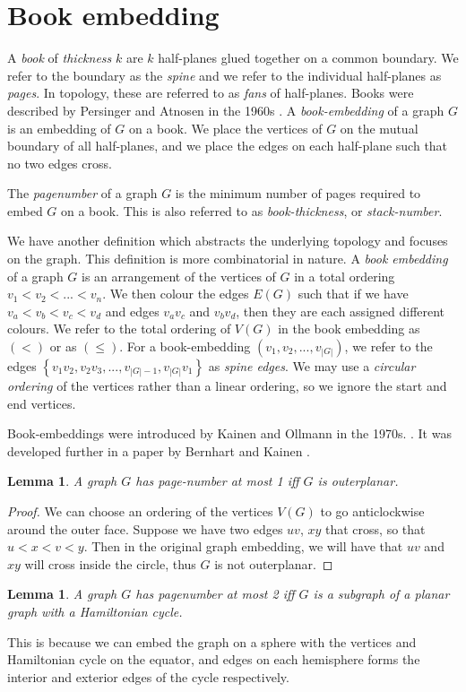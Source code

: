 \documentclass[]{report}
\newtheorem{lemma}[theorem]{Lemma}
\theoremstyle{definition}
\numberwithin{theorem}{section}
\numberwithin{equation}{section}
\begin{document}
\section{Book embedding}\label{sec:Book Embedding}
A \textit{book} of \textit{thickness} $k$ are $k$ half-planes glued together on a common boundary. We refer to the boundary as the \textit{spine} and we refer to the individual half-planes as \textit{pages}. In topology, these are referred to as \textit{fans} of half-planes. Books were described by Persinger and Atnosen in the 1960s \cite{persingerSubsetsNbooksE31966} \cite{atneosenOnedimensionalNleavedContinua1972}. 
A \textit{book-embedding} of a graph $G$ is an embedding of $G$ on a book. We place the vertices of $G$ on the mutual boundary of all half-planes, and we place the edges on each half-plane such that no two edges cross.

The \textit{pagenumber} of a graph $G$ is the minimum number of pages required to embed $G$ on a book. This is also referred to as \textit{book-thickness}, or \textit{stack-number}. 

We have another definition which abstracts the underlying topology and focuses on the graph. This definition is more combinatorial in nature. 
A \textit{book embedding} of a graph $G$ is an arrangement of the vertices of $G$ in a total ordering $v_1 < v_2 < ... < v_n$. We then colour the edges $E(G)$ such that if we have $v_a < v_b < v_c < v_d$ and edges $v_a v_c$ and $v_b v_d$, then they are each assigned different colours.
We refer to the total ordering of $V(G)$ in the book embedding as $(<)$ or as $(\leq)$. For a book-embedding $(v_1, v_2, ..., v_{|G|})$, we refer to the edges $\left\{v_1 v_2, v_2 v_3, ..., v_{|G| - 1}, v_{|G|}v_{1}\right\}$ as \textit{spine edges}.
We may use a \textit{circular ordering} of the vertices rather than a linear ordering, so we ignore the start and end vertices.

Book-embeddings were introduced by Kainen and Ollmann in the 1970s. \cite{kainenRecentResultsTopological1974} \cite{ollmannBookThicknessVarious1973}. It was developed further in a paper by Bernhart and Kainen \cite{bernhartBookThicknessGraph1979}. 
\begin{lemma}\label{lem:Pagenumber_1}
	A graph $G$ has page-number at most 1 iff $G$ is outerplanar.
\end{lemma}
\begin{proof}
	We can choose an ordering of the vertices $V(G)$ to go anticlockwise around the outer face. Suppose we have two edges $uv$, $xy$ that cross, so that $u < x < v < y$. Then in the original graph embedding, we will have that $uv$ and $xy$ will cross inside the circle, thus $G$ is not outerplanar. 
\end{proof}
\begin{lemma}\label{lem:Pagenumber_2}
	A graph $G$ has pagenumber at most 2 iff $G$ is a subgraph of a planar graph with a Hamiltonian cycle.
\end{lemma}
This is because we can embed the graph on a sphere with the vertices and Hamiltonian cycle on the equator, and edges on each hemisphere forms the interior and exterior edges of the cycle respectively.
\end{document}
